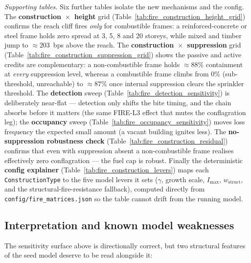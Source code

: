 \documentclass[11pt,a4paper]{article}
\begin{document}
\medskip\noindent\emph{Supporting tables.} Six further tables isolate the new
mechanisms and the config. The \textbf{construction~$\times$~height} grid
(Table~\ref{tab:fire_construction_height_grid}) confirms the reach cliff fires
\emph{only} for combustible frames: a reinforced-concrete or steel frame holds
zero spread at 3, 5, 8 and 20 storeys, while mixed and timber jump to
$\approx 203$~bps above the reach. The \textbf{construction~$\times$~suppression}
grid (Table~\ref{tab:fire_construction_suppression_grid}) shows the passive and
active credits are complementary: a non-combustible frame holds $\approx 88\%$
containment at \emph{every} suppression level, whereas a combustible frame climbs
from $0\%$ (sub-threshold, unreachable) to $\approx 87\%$ once internal
suppression clears the sprinkler threshold. The \textbf{detection} sweep
(Table~\ref{tab:fire_detection_sensitivity}) is deliberately near-flat ---
detection only shifts the bite timing, and the chain absorbs before it matters
(the same FIRE-L3 effect that mutes the conflagration leg); the
\textbf{occupancy} sweep (Table~\ref{tab:fire_occupancy_sensitivity}) moves loss
frequency the expected small amount (a vacant building ignites less). The
\textbf{no-suppression robustness check}
(Table~\ref{tab:fire_construction_residual}) confirms that even with suppression
absent a non-combustible frame realises effectively zero conflagration --- the
fuel cap is robust. Finally the deterministic \textbf{config explainer}
(Table~\ref{tab:fire_construction_levers}) maps each \texttt{ConstructionType} to
the five model levers it sets ($\gamma$, growth scale, $I_{\max}$,
$w_{\text{struct}}$, and the structural-fire-resistance fallback), computed
directly from \texttt{config/fire\_matrices.json} so the table cannot drift from
the running model.



\subsection{Interpretation and known model weaknesses}

The sensitivity surface above is directionally correct, but two structural
features of the seed model deserve to be read alongside it:
\end{document}
